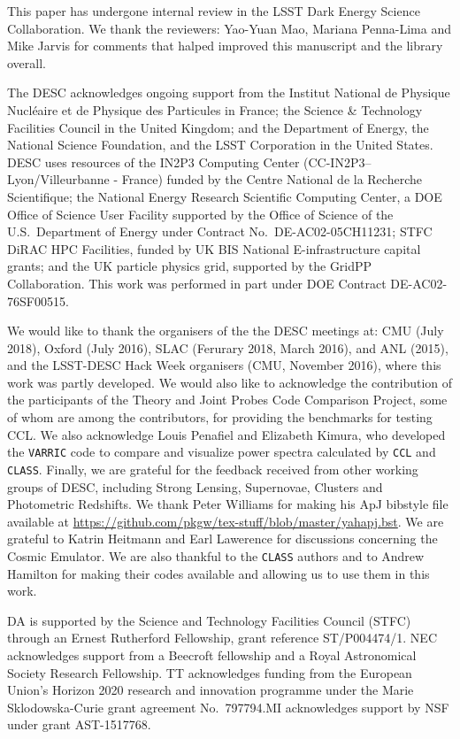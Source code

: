 %
This paper has undergone internal review in the LSST Dark Energy Science Collaboration. We thank the reviewers: Yao-Yuan Mao, Mariana Penna-Lima and Mike Jarvis for comments that halped improved this manuscript and the \ccl library overall. 

The DESC acknowledges ongoing support from the Institut National de Physique Nucl\'eaire et de Physique des Particules in France; the Science \& Technology Facilities Council in the United Kingdom; and the Department of Energy, the National Science Foundation, and the LSST Corporation in the United States.  DESC uses resources of the IN2P3 Computing Center (CC-IN2P3--Lyon/Villeurbanne - France) funded by the Centre National de la Recherche Scientifique; the National Energy Research Scientific Computing Center, a DOE Office of Science User Facility supported by the Office of Science of the U.S.\ Department of Energy under Contract No.\ DE-AC02-05CH11231; STFC DiRAC HPC Facilities, funded by UK BIS National E-infrastructure capital grants; and the UK particle physics grid, supported by the GridPP Collaboration.  This work was performed in part under DOE Contract DE-AC02-76SF00515. 

We would like to thank the organisers of the the DESC meetings at: CMU (July 2018), Oxford (July 2016), SLAC (Ferurary 2018, March 2016), and ANL (2015), and the LSST-DESC Hack Week organisers (CMU, November 2016), where this work was partly developed. We would also like to acknowledge the contribution of the participants of the Theory and Joint Probes Code Comparison Project, some of whom are among the \ccl contributors, for providing the benchmarks for testing CCL. We also acknowledge Louis Penafiel and Elizabeth Kimura, who developed the {\tt VARRIC} code to compare and visualize power spectra calculated by {\tt CCL} and {\tt CLASS}. Finally, we are grateful for the feedback received from other working groups of DESC, including Strong Lensing, Supernovae, Clusters and Photometric Redshifts.
We thank Peter Williams for making his ApJ bibstyle file available at \url{https://github.com/pkgw/tex-stuff/blob/master/yahapj.bst}. We are grateful to Katrin Heitmann and Earl Lawerence for discussions concerning the Cosmic Emulator. We are also thankful to the {\tt CLASS} authors and to Andrew Hamilton for making their codes available and allowing us to use them in this work. 
%

DA is supported by the Science and Technology Facilities Council (STFC) through an Ernest Rutherford Fellowship, grant reference ST/P004474/1. NEC acknowledges support from a Beecroft fellowship and a Royal Astronomical Society Research Fellowship. TT acknowledges funding from the European Union's Horizon 2020 research and innovation programme under the Marie Sk{l}odowska-Curie grant agreement No.\ 797794.MI acknowledges support by NSF under grant AST-1517768.
